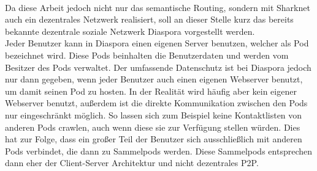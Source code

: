 \\Da diese Arbeit jedoch nicht nur das semantische Routing, sondern mit Sharknet auch ein dezentrales Netzwerk realisiert, soll an dieser Stelle kurz das bereits bekannte dezentrale soziale Netzwerk Diaspora vorgestellt werden.
\\ Jeder Benutzer kann in Diaspora einen eigenen Server benutzen, welcher als Pod bezeichnet wird. Diese Pods beinhalten die Benutzerdaten und werden vom Besitzer des Pods verwaltet. Der umfassende Datenschutz ist bei Diaspora jedoch nur dann gegeben, wenn jeder Benutzer auch einen eigenen Webserver benutzt, um damit seinen Pod zu hosten. In der Realität wird häufig aber kein eigener Webserver benutzt, außerdem ist die direkte Kommunikation zwischen den Pods nur eingeschränkt möglich. So lassen sich zum Beispiel keine Kontaktlisten von anderen Pods crawlen, auch wenn diese sie zur Verfügung stellen würden. Dies hat zur Folge, dass ein großer Teil der Benutzer sich ausschließlich mit anderen Pods verbindet, die dann zu Sammelpods werden. Diese Sammelpods entsprechen dann eher der Client-Server Architektur und nicht dezentrales P2P.
\newpage

